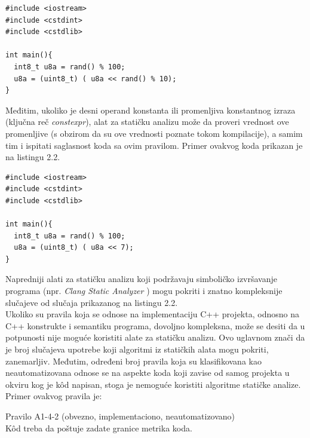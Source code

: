 \documentclass[12pt,oneside]{memoir}
\begin{document}
\begin{lstlisting}[style=customc, caption={K\^{o}d za koji stati\v{c}ka analiza u op\v{s}tem slu\v{c}aju ne mo\v{z}e da d\^{a} precizne rezultate.},label={lst:label1}]
#include <iostream>
#include <cstdint>
#include <cstdlib>

int main(){
  int8_t u8a = rand() % 100;
  u8a = (uint8_t) ( u8a << rand() % 10);
}
\end{lstlisting}
Međitim, ukoliko je desni operand konstanta ili promenljiva konstantnog izraza (klju\v{c}na re\v{c} \textit{constexpr}), alat za stati\v{c}ku analizu mo\v{z}e da proveri vrednost ove promenljive (s obzirom da su ove vrednosti poznate tokom kompilacije), a samim tim i ispitati saglasnost koda sa ovim pravilom.
  Primer ovakvog koda prikazan je na listingu 2.2. \\

\begin{lstlisting}[style=customc, caption={K\^{o}d čija se ispravnost jednostavno može utvrditi statičkom analizom.},label={lst:label2}]
#include <iostream>
#include <cstdint>
#include <cstdlib>

int main(){
  int8_t u8a = rand() % 100;
  u8a = (uint8_t) ( u8a << 7);
}
\end{lstlisting}

  Napredniji alati za statičku analizu koji podržavaju simboličko izvršavanje programa (npr. \textit{Clang Static Analyzer} \cite{CSAWebsite}) mogu pokriti i znatno kompleksnije 
  slučajeve od slučaja prikazanog na listingu 2.2.
  \\
  \indent 
  Ukoliko su pravila koja se odnose na implementaciju C++ projekta, odnosno na C++ konstrukte i semantiku programa, dovoljno kompleksna, može se desiti da u potpunosti nije moguće koristiti alate za statičku analizu. Ovo uglavnom znači da je broj slučajeva upotrebe koji algoritmi iz statičkih alata mogu pokriti, zanemarljiv. Međutim, određeni broj pravila koja su klasifikovana kao neautomatizovana odnose se na aspekte koda koji zavise od samog projekta
  u okviru kog je k\^{o}d napisan, stoga je nemoguće koristiti algoritme statičke analize.
  Primer ovakvog pravila je:

\begin{center}
\begin{tcolorbox}
Pravilo A1-4-2 (obvezno, implementaciono, neautomatizovano) \\
K\^{o}d treba da poštuje zadate granice metrika koda.
\end{tcolorbox}
\end{center}
\end{document}
